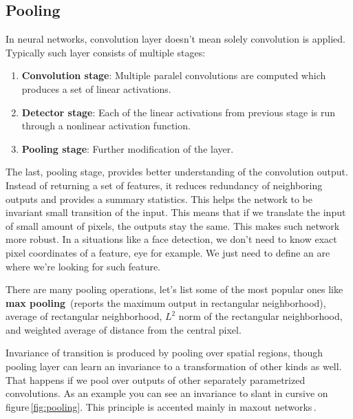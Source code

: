 \subsection{Pooling}

In neural networks, convolution layer doesn't mean solely convolution is applied. Typically such layer consists of multiple stages:

\begin{enumerate}
    \item \textbf{Convolution stage}: Multiple paralel convolutions are computed which produces a set of linear activations.
    \item \textbf{Detector stage}: Each of the linear activations from previous stage is run through a nonlinear activation function.
    \item \textbf{Pooling stage}: Further modification of the layer.
\end{enumerate}

The last, pooling stage, provides better understanding of the convolution output. Instead of returning a set of features, it reduces redundancy of neighboring outputs and provides a summary statistics. This helps the network to be invariant small transition of the input. This means that if we translate the input of small amount of pixels, the outputs stay the same. This makes such network more robust. In a situations like a face detection, we don't need to know exact pixel coordinates of a feature, eye for example. We just need to define an are where we're looking for such feature.

There are many pooling operations, let's list some of the most popular ones like \textbf{max pooling}\,\cite{maxpooling} (reports the maximum output in rectangular neighborhood), average of rectangular neighborhood, $L^2$ norm of the rectangular neighborhood, and weighted average of distance from the central pixel.

Invariance of transition is produced by pooling over spatial regions, though pooling layer can learn an invariance to a transformation of other kinds as well. That happens if we pool over outputs of other separately parametrized convolutions. As an example you can see an invariance to slant in cursive on figure\,\ref{fig:pooling}. This principle is accented mainly in maxout networks\,\cite{maxout}.

